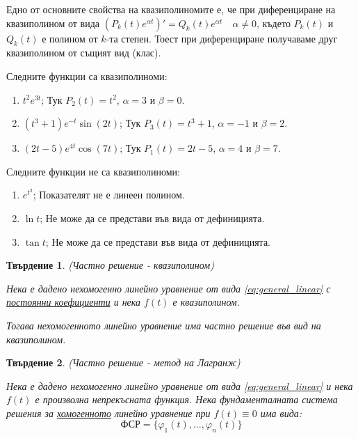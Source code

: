 \documentclass{scrartcl}
\newtheorem{statement}{Твърдение}
\begin{document}
\begin{FlushLeft}
Едно от основните свойства на квазиполиномите е, че при диференциране на квазиполином от вида $(P_k(t)e^{\alpha t})' = Q_k(t)e^{\alpha t} \quad \alpha \ne 0$, където $P_k(t)$ и $Q_k(t)$ е полином от $k$-та степен. Тоест при диференциране получаваме друг квазиполином от същият вид (клас).

Следните функции са квазиполиноми:

\begin{enumerate}
\item $t^2e^{3t}$; Тук $P_2(t)=t^2$, $\alpha=3$ и $\beta=0$.

\item $(t^3+1)e^{-t}\sin(2t)$; Тук $P_3(t)=t^3+1$, $\alpha=-1$ и $\beta=2$.

\item $(2t-5)e^{4t}\cos(7t)$; Тук $P_1(t)=2t-5$, $\alpha=4$ и $\beta=7$.

\end{enumerate}

Следните функции не са квазиполиноми:

\begin{enumerate}
\item $e^{t^2}$; Показателят не е линеен полином.

\item $\ln t$; Не може да се представи във вида от дефиницията.

\item $\tan t$; Не може да се представи във вида от дефиницията.

\end{enumerate}

\begin{statement}\label{solution_quasepoly}
(Частно решение - квазиполином)

Нека е дадено нехомогенно линейно уравнение от вида \eqref{eq:general_linear} с \underline{постоянни коефициенти} и нека $f(t)$ е квазиполином.

Тогава нехомогенното линейно уравнение има частно решение във вид на квазиполином.
\end{statement}

\begin{statement}\label{solution_lagrange}
(Частно решение - метод на Лагранж)

Нека е дадено нехомогенно линейно уравнение от вида \eqref{eq:general_linear} и нека $f(t)$ е произволна непрекъсната функция.
Нека фундаменталната система решения за \underline{хомогенното} линейно уравнение при $f(t) \equiv 0$ има вида:
$$\text{ФСР} = \{\varphi_1(t), \dots, \varphi_n(t)\}$$


\end{statement}
\end{FlushLeft}
\end{document}

